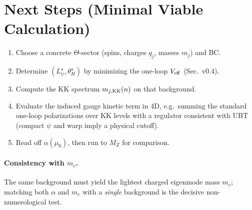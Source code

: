 \documentclass[12pt]{article}
\begin{document}
\section{Next Steps (Minimal Viable Calculation)}
\begin{enumerate}
\item Choose a concrete $\Theta$-sector (spins, charges $q_j$, masses $m_j$) and BC.
\item Determine $(L_\psi^\star,\theta_H^\star)$ by minimizing the one-loop $V_{\rm eff}$ (Sec.~v0.4).
\item Compute the KK spectrum $m_{j,{\rm KK}}(n)$ on that background.
\item Evaluate the induced gauge kinetic term in 4D, e.g.\ summing the standard one-loop polarizations over KK levels with a regulator consistent with UBT (compact $\psi$ and warp imply a physical cutoff).
\item Read off $\alpha(\mu_0)$, then run to $M_Z$ for comparison.
\end{enumerate}

\paragraph{Consistency with $m_e$.}
The same background must yield the lightest charged eigenmode mass $m_e$; matching both $\alpha$ and $m_e$ with a \emph{single} background is the decisive non-numerological test.
\end{document}
